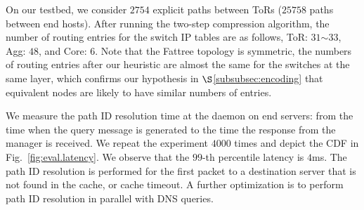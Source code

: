 

 On our testbed, we consider $2754$ explicit paths between ToRs ($25758$ paths between end hosts). After running the two-step compression algorithm, the number of routing entries for the switch IP tables are as follows, ToR: $31$$\sim$$33$, Agg: $48$, and Core: $6$. Note that the Fattree topology is symmetric, the numbers of routing entries after our heuristic are almost the same for the switches at the same layer, which confirms our hypothesis in $\S$\ref{subsubsec:encoding} that equivalent nodes are likely to have similar numbers of entries.

We measure the path ID resolution time at the \sys daemon on end servers: from the time when the query message is generated to the time the response from the \sys manager is received. We repeat the experiment $4000$ times and depict the CDF in Fig.~\ref{fig:eval.latency}. We observe that the $99$-th percentile latency is $4$ms.  The path ID resolution is performed for the first packet to a destination server that is not found in the cache, or cache timeout. A further optimization is to perform path ID resolution in parallel with DNS queries.

